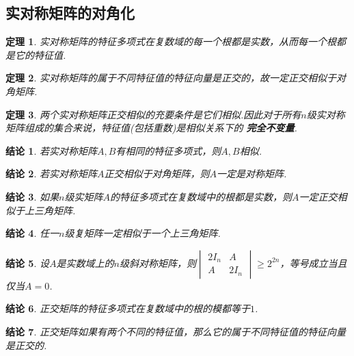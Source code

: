 \documentclass[UTF8]{article}
\newtheorem{thrm}{定理}[subsection]
\newtheorem{ccl}{结论}[subsection]
\begin{document}
\subsection{实对称矩阵的对角化}
\begin{thrm}
  实对称矩阵的特征多项式在复数域的每一个根都是实数，从而每一个根都是它的特征值.
\end{thrm}
\begin{thrm}
  实对称矩阵的属于不同特征值的特征向量是正交的，故一定正交相似于对角矩阵.
\end{thrm}
\begin{thrm}
  两个实对称矩阵正交相似的充要条件是它们相似.因此对于所有$n$级实对称矩阵组成的集合来说，特征值(包括重数)是相似关系下的
  \textbf{完全不变量}.
\end{thrm}
\begin{ccl}
  若实对称矩阵$A,B$有相同的特征多项式，则$A,B$相似.
\end{ccl}
\begin{ccl}
  若实对称矩阵$A$正交相似于对角矩阵，则$A$一定是对称矩阵.
\end{ccl}
\begin{ccl}
  如果$n$级实矩阵$A$的特征多项式在复数域中的根都是实数，则$A$一定正交相似于上三角矩阵.
\end{ccl}
\begin{ccl}
  任一$n$级复矩阵一定相似于一个上三角矩阵.
\end{ccl}
\begin{ccl}
  设$A$是实数域上的$n$级斜对称矩阵，则$\begin{vmatrix} 2I_n&A\\A&2I_n \end{vmatrix}\ge 2^{2n}$，等号成立当且仅当$A=0$.
\end{ccl}
\begin{ccl}
  正交矩阵的特征多项式在复数域中的根的模都等于$1$.
\end{ccl}
\begin{ccl}
  正交矩阵如果有两个不同的特征值，那么它的属于不同特征值的特征向量是正交的.
\end{ccl}
\end{document}
